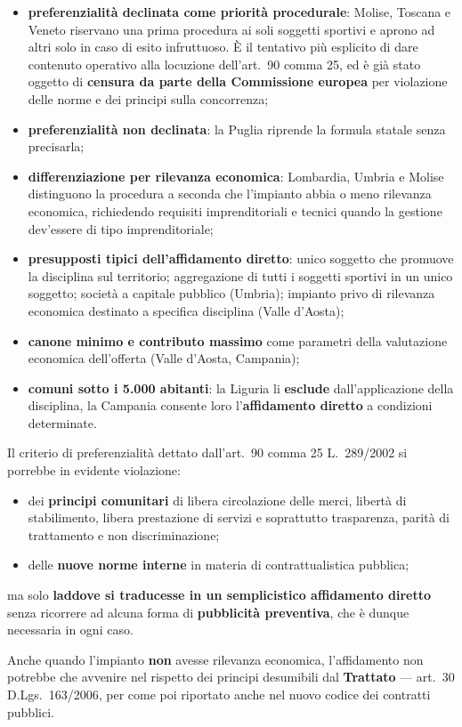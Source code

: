 \begin{itemize}
  \item \textbf{preferenzialità declinata come priorità procedurale}: Molise, Toscana e Veneto
    riservano una prima procedura ai soli soggetti sportivi e aprono ad altri solo in caso di esito
    infruttuoso. È il tentativo più esplicito di dare contenuto operativo alla locuzione dell'art.\
    90 comma 25, ed è già stato oggetto di \textbf{censura da parte della Commissione europea} per
    violazione delle norme e dei principi sulla concorrenza;
  \item \textbf{preferenzialità non declinata}: la Puglia riprende la formula statale senza
    precisarla;
  \item \textbf{differenziazione per rilevanza economica}: Lombardia, Umbria e Molise distinguono
    la procedura a seconda che l'impianto abbia o meno rilevanza economica, richiedendo requisiti
    imprenditoriali e tecnici quando la gestione dev'essere di tipo imprenditoriale;
  \item \textbf{presupposti tipici dell'affidamento diretto}: unico soggetto che promuove la
    disciplina sul territorio; aggregazione di tutti i soggetti sportivi in un unico soggetto;
    società a capitale pubblico (Umbria); impianto privo di rilevanza economica destinato a
    specifica disciplina (Valle d'Aosta);
  \item \textbf{canone minimo e contributo massimo} come parametri della valutazione economica
    dell'offerta (Valle d'Aosta, Campania);
  \item \textbf{comuni sotto i 5.000 abitanti}: la Liguria li \textbf{esclude} dall'applicazione
    della disciplina, la Campania consente loro l'\textbf{affidamento diretto} a condizioni
    determinate.
\end{itemize}


Il criterio di preferenzialità dettato dall'art.\ 90 comma 25 L.\ 289/2002 si porrebbe in evidente
violazione:

\begin{itemize}
  \item dei \textbf{principi comunitari} di libera circolazione delle merci, libertà di
    stabilimento, libera prestazione di servizi e soprattutto trasparenza, parità di trattamento e
    non discriminazione;
  \item delle \textbf{nuove norme interne} in materia di contrattualistica pubblica;
\end{itemize}

ma solo \textbf{laddove si traducesse in un semplicistico affidamento diretto} senza ricorrere ad
alcuna forma di \textbf{pubblicità preventiva}, che è dunque necessaria in ogni caso.

Anche quando l'impianto \textbf{non} avesse rilevanza economica, l'affidamento non potrebbe che
avvenire nel rispetto dei principi desumibili dal \textbf{Trattato} --- art.\ 30 D.Lgs.\ 163/2006,
per come poi riportato anche nel nuovo codice dei contratti pubblici.
